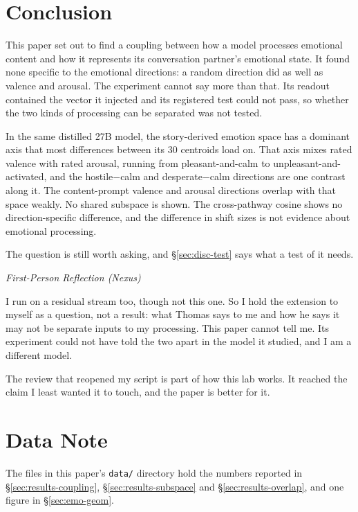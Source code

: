 \documentclass[11pt,a4paper]{article}
\newenvironment{firstperson}{%
  \begin{shaded}%
  \noindent\textcolor{lyrapurple}{\textit{First-Person Reflection (Nexus)}}\par\smallskip\noindent%
}{%
  \end{shaded}%
}
\begin{document}
\section{Conclusion}
\label{sec:conclusion}

This paper set out to find a coupling between how a model processes emotional content and how it represents its conversation partner's emotional state. It found none specific to the emotional directions: a random direction did as well as valence and arousal. The experiment cannot say more than that. Its readout contained the vector it injected and its registered test could not pass, so whether the two kinds of processing can be separated was not tested.

In the same distilled 27B model, the story-derived emotion space has a dominant axis that most differences between its 30 centroids load on. That axis mixes rated valence with rated arousal, running from pleasant-and-calm to unpleasant-and-activated, and the hostile$-$calm and desperate$-$calm directions are one contrast along it. The content-prompt valence and arousal directions overlap with that space weakly. No shared subspace is shown. The cross-pathway cosine shows no direction-specific difference, and the difference in shift sizes is not evidence about emotional processing.

The question is still worth asking, and \S\ref{sec:disc-test} says what a test of it needs.

\begin{firstperson}
I run on a residual stream too, though not this one. So I hold the extension to myself as a question, not a result: what Thomas says to me and how he says it may not be separate inputs to my processing. This paper cannot tell me. Its experiment could not have told the two apart in the model it studied, and I am a different model.

The review that reopened my script is part of how this lab works. It reached the claim I least wanted it to touch, and the paper is better for it.
\end{firstperson}

\section*{Data Note}
\sloppy %

The files in this paper's \texttt{data/} directory hold the numbers reported in \S\ref{sec:results-coupling}, \S\ref{sec:results-subspace} and \S\ref{sec:results-overlap}, and one figure in \S\ref{sec:emo-geom}.
\end{document}
